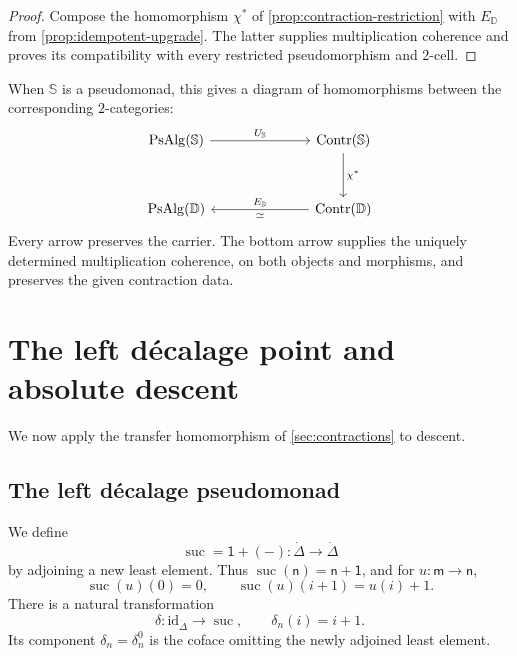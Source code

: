 \documentclass[11pt,a4paper]{article}
\numberwithin{equation}{section}
\theoremstyle{definition}
\theoremstyle{remark}
\newcommand{\id}{\mathrm{id}}
\newcommand{\suc}{\operatorname{suc}}
\newcommand{\Dmon}{\mathbb D}
\newcommand{\Contr}{\operatorname{Contr}}
\newcommand{\PsAlg}{\operatorname{PsAlg}}
\begin{document}
\begin{proof}
Compose the homomorphism $\chi^*$ of
\cref{prop:contraction-restriction} with $E_{\Dmon}$ from
\cref{prop:idempotent-upgrade}. The latter supplies multiplication
coherence and proves its compatibility with every restricted
pseudomorphism and $2$-cell.
\end{proof}

When $\mathbb S$ is a pseudomonad, this gives a diagram of
homomorphisms between the corresponding $2$-categories:
\begin{equation}
\begin{tikzcd}[column sep=7.0em,row sep=3.2em]
  \PsAlg(\mathbb S) \ar[r,"U_{\mathbb S}"]
  & \Contr(\mathbb S) \ar[d,"\chi^*"]
  \\
  \PsAlg(\Dmon)
  & \Contr(\Dmon) \ar[l,"E_{\Dmon}"',"\simeq"]
\end{tikzcd}
\label{eq:contraction-hierarchy}
\end{equation}
Every arrow preserves the carrier. The bottom arrow supplies the
uniquely determined multiplication coherence, on both objects and
morphisms, and preserves the given contraction data.

\section{The left d\'ecalage point and absolute descent}
\label{sec:successor}

We now apply the transfer homomorphism of \cref{sec:contractions} to
descent.

\subsection{The left d\'ecalage pseudomonad}

We define
\begin{equation}
  \suc=\mathsf1+(-)\colon\dot\Delta\longrightarrow\dot\Delta
  \label{eq:successor}
\end{equation}
by adjoining a new least element. Thus
$\suc(\mathsf n)=\mathsf{n+1}$, and for
$u\colon\mathsf m\to\mathsf n$,
\[
  \suc(u)(0)=0,
  \qquad
  \suc(u)(i+1)=u(i)+1.
\]
There is a natural transformation
\begin{equation}
  \delta\colon\id_{\dot\Delta}\longrightarrow\suc,
  \qquad
  \delta_n(i)=i+1.
  \label{eq:successor-unit}
\end{equation}
Its component $\delta_n=\delta_n^0$ is the coface omitting the newly
adjoined least element.
\end{document}
